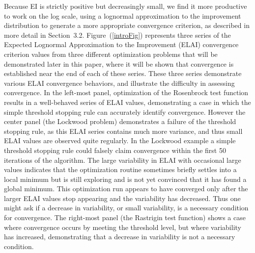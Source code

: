 \documentclass[12pt]{article}
\begin{document}
Because EI is strictly positive but decreasingly small,
we find it more productive to work on the log scale, using a lognormal
approximation to the improvement distribution to generate a more appropriate convergence criterion, as described in more
detail in Section~3.2.
%
Figure~(\ref{introFig}) represents three series of the Expected
Lognormal Approximation to the Improvement (ELAI) convergence criterion values from three
different optimization problems that will be demonstrated later in
this paper, where it will be shown that convergence is established near
the end of each of these series.
These three series demonstrate various ELAI convergence behaviors, and
illustrate the difficulty in assessing convergence.  
%
In the left-most panel, optimization of the Rosenbrock test function 
results in a well-behaved series of ELAI values, demonstrating a case in 
which the simple threshold stopping rule can accurately identify convergence.
However the center panel (the Lockwood problem) demonstrates a failure of 
the threshold stopping rule, as this ELAI series contains much more 
variance, and thus small ELAI values are observed quite regularly.
In the Lockwood example a simple threshold stopping rule could falsely
claim convergence within the first 50 iterations of the algorithm.
%
The large variability in ELAI with occasional large values indicates that 
the optimization routine sometimes briefly settles into a local minimum but is 
still exploring and is not yet convinced that it has found a global minimum.
This optimization run appears to have converged only after the
larger ELAI values stop appearing and the variability has decreased.
%
Thus one might ask if a decrease in variability, or small variability,
is a necessary condition for convergence.  
%
The right-most panel (the Rastrigin test function) 
shows a case where convergence occurs by meeting the threshold level,
but where variability has increased, demonstrating that a decrease in
variability is not a necessary condition.
\end{document}
